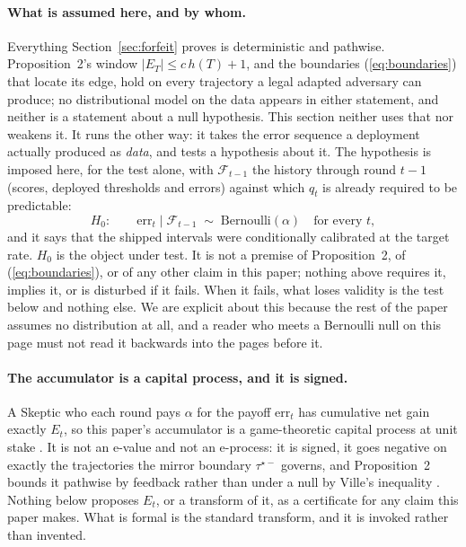 \paragraph{What is assumed here, and by whom.} Everything Section~\ref{sec:forfeit} proves is
deterministic and pathwise. Proposition~2's window $|E_T| \le c\,h(T)+1$, and the boundaries
(\ref{eq:boundaries}) that locate its edge, hold on every trajectory a legal adapted adversary can
produce; no distributional model on the data appears in either statement, and neither is a
statement about a null hypothesis. This section neither uses that nor weakens it. It runs the
other way: it takes the error sequence a deployment actually produced as \emph{data}, and tests a
hypothesis about it. The hypothesis is imposed here, for the test alone, with $\mathcal{F}_{t-1}$
the history through round $t-1$ (scores, deployed thresholds and errors) against which $\hat{q}_t$
is already required to be predictable:
\[
  H_0: \qquad \mathrm{err}_t \mid \mathcal{F}_{t-1} \;\sim\; \mathrm{Bernoulli}(\alpha)
  \quad\text{for every } t ,
\]
and it says that the shipped intervals were conditionally calibrated at the target rate. $H_0$ is
the object under test. It is not a premise of Proposition~2, of (\ref{eq:boundaries}), or of any
other claim in this paper; nothing above requires it, implies it, or is disturbed if it fails.
When it fails, what loses validity is the test below and nothing else. We are explicit about this
because the rest of the paper assumes no distribution at all, and a reader who meets a Bernoulli
null on this page must not read it backwards into the pages before it.

\paragraph{The accumulator is a capital process, and it is signed.} A Skeptic who each round pays
$\alpha$ for the payoff $\mathrm{err}_t$ has cumulative net gain exactly $E_t$, so this paper's
accumulator is a game-theoretic capital process at unit stake
\citep{shafer2019gtfpf,ramdas2023savi}. It is not an e-value and not an e-process: it is signed,
it goes negative on exactly the trajectories the mirror boundary $\tau^{\star-}$ governs, and
Proposition~2 bounds it pathwise by feedback rather than under a null by Ville's inequality
\citep{vovk2021evalues}. Nothing below proposes $E_t$, or a transform of it, as a certificate for
any claim this paper makes. What is formal is the standard transform, and it is invoked rather
than invented.

